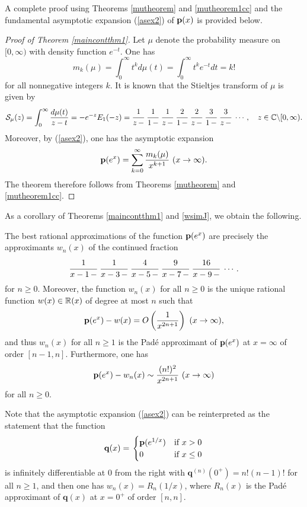 \documentclass[12pt]{article}
\begin{document}
A complete proof using Theorems \ref{mutheorem}  and \ref{mutheorem1cc}  and the fundamental asymptotic expansion (\ref{asex2}) of ${\mathbf p}(x)$  is provided below.   

\begin{proof}[Proof of Theorem \ref{maincontthm1}]
Let $\mu$ denote the probability measure on $[0, \infty)$ with density function $e^{-t}$.  One has
$$m_k(\mu) = \int_0^\infty t^k d \mu(t) = \int_0^\infty t^k e^{-t} dt = k!$$
for all nonnegative integers $k$.   It is known \cite[p.\ 87]{cuyt} that the Stieltjes transform of $\mu$ is given by
$${\mathcal S}_\mu(z) = \int_0^\infty \frac{d \mu(t)}{z-t} = -e^{-z}E_1(-z) = \cfrac{1}{z \,-} \  \cfrac{1}{1 \,-} \  \cfrac{1}{z \,-}\  \cfrac{2}{1 \,-}\  \cfrac{2}{z \,-} \  \cfrac{3}{1 \,-}\  \cfrac{3}{z \,-} \ \cdots, \quad z \in {\mathbb C} \backslash [0,\infty).$$
Moreover, by (\ref{asex2}), one has the asymptotic expansion
$${\mathbf p}(e^x) = \sum_{k = 0}^{\infty} \frac{m_k(\mu)}{x^{k+1}} \ (x \to \infty).$$
The theorem therefore follows from Theorems \ref{mutheorem} and \ref{mutheorem1cc}.
\end{proof}




As a corollary of Theorems \ref{maincontthm1} and \ref{wsimJ}, we obtain the following.

\begin{corollary}\label{maincor}
The best rational approximations of the function ${\mathbf p}(e^x)$ are precisely the approximants $w_n(x)$ of the continued fraction \begin{align*}
\cfrac{1}{x-1 \,-} \  \cfrac{1}{x-3 \,-} \  \cfrac{4}{x-5 \,-}\  \cfrac{9}{x-7 \,-}\  \cfrac{16}{x-9 \,-} \  \cdots.
\end{align*}
for $n \geq 0$.  Moreover, the function $w_n(x)$ for all $n \geq 0$ is the unique rational function  $w(x) \in {\mathbb R}(x)$ of degree at most $n$ such that $${\mathbf p}(e^x) -w(x) = O\left(\frac{1}{x^{2n+1}} \right) \ (x \to \infty),$$ and thus  $w_n(x)$ for all $n \geq 1$ is the Pad\'e approximant of ${\mathbf p}(e^x)$  at $x = \infty$ of order $[n-1,n]$.    Furthermore, one has
 $${\mathbf p}(e^x)- w_n(x) \sim \frac{(n!)^2}{x^{2n+1}}  \ (x \to \infty)$$
for all $n \geq 0$.
\end{corollary}

Note that the asymptotic expansion (\ref{asex2}) can be reinterpreted  as  the statement that the function $${\mathbf q}(x)  =    \left.
  \begin{cases}
   {\mathbf p}(e^{1/x}) & \text{if } x > 0 \\
    0  & \text{if } x \leq 0
 \end{cases}
 \right.$$ is infinitely differentiable at $0$ from the right with ${{\mathbf q}^{(n)}(0^+)} = n! (n-1)!$
for all $n \geq 1$, and then one has $w_n(x) = R_n(1/x)$, where $R_n(x)$ is the Pad\'e approximant of ${\mathbf q}(x)$  at $x = 0^+$ of order $[n,n]$.
\end{document}
